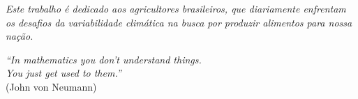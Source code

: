 \documentclass[
	12pt,				%
	openright,			%
	oneside,			%
	a4paper,			%
	english,			%
	french,				%
	spanish,			%
	brazil				%
	]{abntex2}
\begin{document}
\begin{dedicatoria}
   \vspace*{\fill}
   \centering
   \noindent
   \textit{Este trabalho é dedicado aos agricultores brasileiros, que diariamente enfrentam os desafios da variabilidade climática na busca por produzir alimentos para nossa nação.} \vspace*{\fill}
\end{dedicatoria}

\begin{agradecimentos}

\end{agradecimentos}

\begin{epigrafe}
    \vspace*{\fill}
	\begin{flushright}
		\textit{``In mathematics you don't understand things.\\
		You just get used to them.''}\\
		(John von Neumann)
	\end{flushright}
\end{epigrafe}

\end{document}
